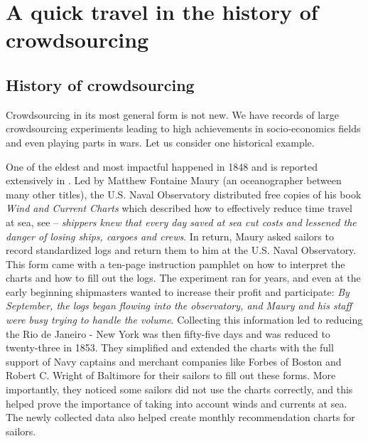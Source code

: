 \chapter{A quick travel in the history of crowdsourcing}
\label{chap:history-crowdsourcing}
\section{History of crowdsourcing}
\label{sec:history-of-crowdsourcing}
Crowdsourcing in its most general form is not new. We have records of large crowdsourcing experiments leading to high achievements in socio-economics fields and even playing parts in wars. Let us consider one historical example.

One of the eldest and most impactful happened in 1848 and is reported extensively in \citet{tracksinthesea}. Led by Matthew Fontaine Maury (an oceanographer between many other titles), the U.S. Naval Observatory distributed free copies of his book \emph{Wind and Current Charts} which described how to effectively reduce time travel at sea, see  -- \emph{shippers knew that every day saved at sea cut costs and lessened the danger of losing ships, cargoes and crews}. In return, Maury asked sailors to record standardized logs and return them to him at the U.S. Naval Observatory.
This form came with a ten-page instruction pamphlet on how to interpret the charts and how to fill out the logs.
The experiment ran for years, and even at the early beginning shipmasters wanted to increase their profit and participate: \emph{By September, the logs began flowing into the observatory, and Maury and his staff were busy trying to handle the volume}.
Collecting this information led to reducing the Rio de Janeiro - New York was then fifty-five days and was reduced to twenty-three in 1853.
They simplified and extended the charts with the full support of Navy captains and merchant companies like Forbes of Boston and Robert C. Wright of Baltimore for their sailors to fill out these forms.
More importantly, they noticed some sailors did not use the charts correctly, and this helped prove the importance of taking into account winds and currents at sea.
The newly collected data also helped create monthly recommendation charts for sailors.
